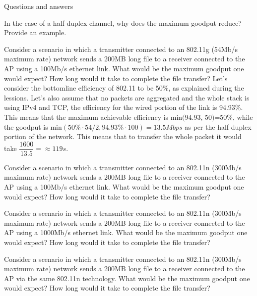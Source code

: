 \begin{section}{Questions and answers}
\begin{subsubsection}{In the case of a half-duplex channel, why does the maximum goodput reduce?
    Provide an example.}
  \end{subsubsection}
  \begin{subsubsection}{Consider a scenario in which a transmitter connected to an 802.11g (54Mb/s
      maximum rate) network sends a 200MB long file to a receiver connected to the AP using a
      100Mb/s ethernet link. What would be the maximum goodput one would expect? How long would it
    take to complete the file transfer?}
    Let's consider the bottomline efficiency of 802.11 to be 50\%, as explained during the lessions.
    Let's also assume that no packets are aggregated and the whole stack is using IPv4 and TCP, the
    efficiency for the wired portion of the link is 94.93\%. This means that the maximum achievable
    efficiency is $\text{min(94.93, 50)=50\%}$, while the goodput is $\text{min}(50\%\cdot
    54/2,94.93\%\cdot 100)=13.5Mbps$ as per the half duplex portion of the network. This means that to
    transfer the whole packet it would take $\dfrac{1600}{13.5}= \approx 119s$. 
  \end{subsubsection}
  \begin{subsubsection}{Consider a scenario in which a transmitter connected to an 802.11n (300Mb/s
      maximum rate) network sends a 200MB long file to a receiver connected to the AP using a
      100Mb/s ethernet link. What would be the maximum goodput one would expect? How long would it
    take to complete the file transfer?}
  \end{subsubsection}
  \begin{subsubsection}{Consider a scenario in which a transmitter connected to an 802.11n (300Mb/s
      maximum rate) network sends a 200MB long file to a receiver connected to the AP using a
      1000Mb/s ethernet link. What would be the maximum goodput one would expect? How long would it
    take to complete the file transfer?}
  \end{subsubsection}
  \begin{subsubsection}{Consider a scenario in which a transmitter connected to an 802.11n (300Mb/s
      maximum rate) network sends a 200MB long file to a receiver connected to the AP via the same
      802.11n technology. What would be the maximum goodput one would expect? How long would it take
    to complete the file transfer?}
  \end{subsubsection}
  

\end{section}
